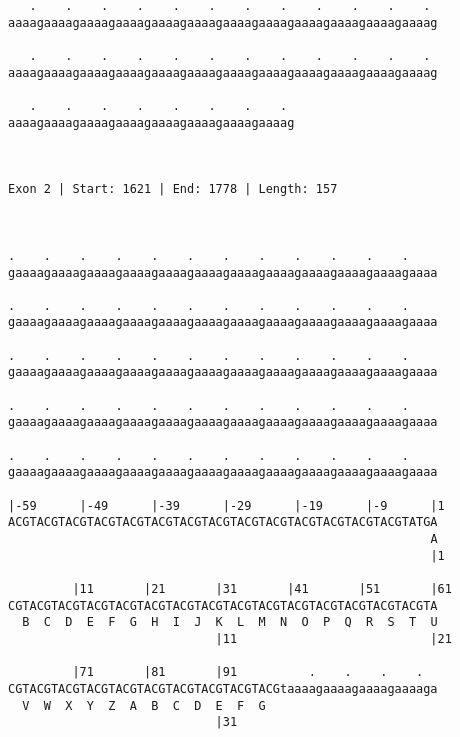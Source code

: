 \documentclass{article}
\begin{document}
\begin{Verbatim}
   .    .    .    .    .    .    .    .    .    .    .    . 
aaaagaaaagaaaagaaaagaaaagaaaagaaaagaaaagaaaagaaaagaaaagaaaag
                                                            
   .    .    .    .    .    .    .    .    .    .    .    . 
aaaagaaaagaaaagaaaagaaaagaaaagaaaagaaaagaaaagaaaagaaaagaaaag
                                                            
   .    .    .    .    .    .    .    . 
aaaagaaaagaaaagaaaagaaaagaaaagaaaagaaaag
                                        
                                        
 
Exon 2 | Start: 1621 | End: 1778 | Length: 157



.    .    .    .    .    .    .    .    .    .    .    .    
gaaaagaaaagaaaagaaaagaaaagaaaagaaaagaaaagaaaagaaaagaaaagaaaa
                                                            
.    .    .    .    .    .    .    .    .    .    .    .    
gaaaagaaaagaaaagaaaagaaaagaaaagaaaagaaaagaaaagaaaagaaaagaaaa
                                                            
.    .    .    .    .    .    .    .    .    .    .    .    
gaaaagaaaagaaaagaaaagaaaagaaaagaaaagaaaagaaaagaaaagaaaagaaaa
                                                            
.    .    .    .    .    .    .    .    .    .    .    .    
gaaaagaaaagaaaagaaaagaaaagaaaagaaaagaaaagaaaagaaaagaaaagaaaa
                                                            
.    .    .    .    .    .    .    .    .    .    .    .    
gaaaagaaaagaaaagaaaagaaaagaaaagaaaagaaaagaaaagaaaagaaaagaaaa
                                                            
|-59      |-49      |-39      |-29      |-19      |-9      |1
ACGTACGTACGTACGTACGTACGTACGTACGTACGTACGTACGTACGTACGTACGTATGA
                                                           A
                                                           |1
  
         |11       |21       |31       |41       |51       |61
CGTACGTACGTACGTACGTACGTACGTACGTACGTACGTACGTACGTACGTACGTACGTA
  B  C  D  E  F  G  H  I  J  K  L  M  N  O  P  Q  R  S  T  U
                             |11                           |21
  
         |71       |81       |91          .    .    .    .  
CGTACGTACGTACGTACGTACGTACGTACGTACGTACGtaaaagaaaagaaaagaaaaga
  V  W  X  Y  Z  A  B  C  D  E  F  G                        
                             |31                            
  

\end{Verbatim}
\end{document}
